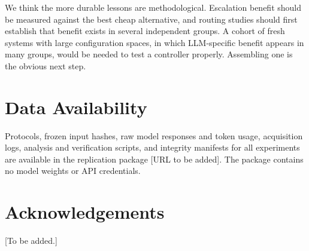 We think the more durable lessons are methodological. Escalation benefit should be measured against the best cheap alternative, and routing studies should first establish that benefit exists in several independent groups. A cohort of fresh systems with large configuration spaces, in which LLM-specific benefit appears in many groups, would be needed to test a controller properly. Assembling one is the obvious next step.

\section*{Data Availability}

Protocols, frozen input hashes, raw model responses and token usage, acquisition logs, analysis and verification scripts, and integrity manifests for all experiments are available in the replication package [URL to be added]. The package contains no model weights or API credentials.

\section*{Acknowledgements}

[To be added.]





